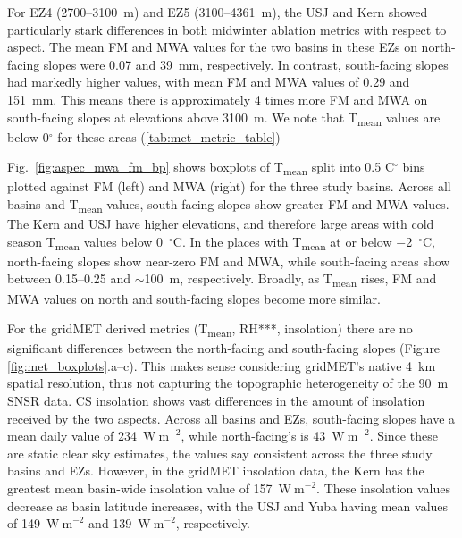 For EZ4 (2700--3100~m) and EZ5 (3100--4361~m), the USJ and Kern showed particularly stark differences in both midwinter ablation metrics with respect to aspect. The mean FM and MWA values for the two basins in these EZs on north-facing slopes were 0.07 and 39~mm, respectively. In contrast, south-facing slopes had markedly higher values, with mean FM and MWA values of 0.29 and 151~mm. This means there is approximately 4 times more FM and MWA on south-facing slopes at elevations above 3100~m. We note that T\textsubscript{mean} values are below 0$^{\circ}$ for these areas (\ref{tab:met_metric_table})

Fig.~\ref{fig:aspec_mwa_fm_bp} shows boxplots of T\textsubscript{mean} split into 0.5 C$^{\circ}$ bins plotted against FM (left) and MWA (right) for the three study basins. Across all basins and T\textsubscript{mean} values, south-facing slopes show greater FM and MWA values.  The Kern and USJ have higher elevations, and therefore large areas with cold season T\textsubscript{mean} values below 0~$^{\circ}$C. In the places with T\textsubscript{mean} at or below $-$2~$^{\circ}$C, north-facing slopes show near-zero FM and MWA, while south-facing areas show between 0.15--0.25 and $\sim$100~m, respectively. Broadly, as T\textsubscript{mean} rises, FM and MWA values on north and south-facing slopes become more similar.

For the gridMET derived metrics (T\textsubscript{mean}, RH***, insolation) there are no significant differences between the north-facing and south-facing slopes (Figure \ref{fig:met_boxplots}.a--c). This makes sense considering gridMET's native 4~km spatial resolution, thus not capturing the topographic heterogeneity of the 90~m SNSR data. CS insolation shows vast differences in the amount of insolation received by the two aspects. Across all basins and EZs, south-facing slopes have a mean daily value of 234~$\mathrm{W~m}^{-2}$, while north-facing's is 43~$\mathrm{W~m}^{-2}$. Since these are static clear sky estimates, the values say consistent across the three study basins and EZs. However, in the gridMET insolation data, the Kern has the greatest mean basin-wide insolation value of 157~$\mathrm{W~m}^{-2}$. These insolation values decrease as basin latitude increases, with the USJ and Yuba having mean values of 149~$\mathrm{W~m}^{-2}$ and 139~$\mathrm{W~m}^{-2}$, respectively.

